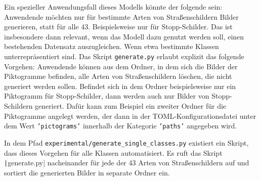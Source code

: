 Ein spezieller Anwendungsfall dieses Modells könnte der folgende sein: Anwendende möchten nur für bestimmte Arten von Straßenschildern Bilder generieren, statt für alle 43. Beispielsweise nur für Stopp-Schilder. Das ist insbesondere dann relevant, wenn das Modell dazu genutzt werden soll, einen bestehenden Datensatz auszugleichen. Wenn etwa bestimmte Klassen unterrepräsentiert sind.
Das Skript \texttt{generate.py} erlaubt explizit das folgende Vorgehen: Anwendende können aus dem Ordner, in dem sich die Bilder der Piktogramme befinden, alle Arten von Straßenschildern löschen, die nicht generiert werden sollen. Befindet sich in dem Ordner beispielsweise nur ein Piktogramm für Stopp-Schilder, dann werden auch nur Bilder von Stopp-Schildern generiert. Dafür kann zum Beispiel ein zweiter Ordner für die Piktogramme angelegt werden, der dann in der \ac{TOML}-Konfigurationsdatei unter dem Wert \texttt{'pictograms'} innerhalb der Kategorie \texttt{'paths'} angegeben wird.

In dem Pfad \texttt{experimental/generate_single_classes.py} existiert ein Skript, dass dieses Vorgehen für alle Klassen automatisiert. Es ruft das Skript \texttt|generate.py| nacheinander für jede der 43 Arten von Straßenschildern auf und sortiert die generierten Bilder in separate Ordner ein.